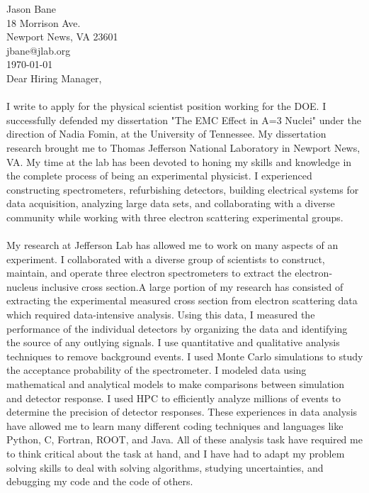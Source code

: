\documentclass[12pt,letterpaper]{article}
\newcommand{\CPP}
{C\nolinebreak[4]\hspace{-.05em}\raisebox{.22ex}{\footnotesize\bf ++}}
\begin{document}
\vspace*{-1.2cm}
\noindent Jason Bane\\
18 Morrison Ave. \\
Newport News, VA 23601 \\
jbane@jlab.org \\
\today\\

Dear Hiring Manager,

\paragraph{}I write to apply for the physical scientist position working for the DOE. I successfully defended my dissertation "The EMC Effect in A=3 Nuclei" under the direction of Nadia Fomin, at the University of Tennessee. My dissertation research brought me to Thomas Jefferson National Laboratory in Newport News, VA. My time at the lab has been devoted to honing my skills and knowledge in the complete process of being an experimental physicist. I experienced constructing spectrometers, refurbishing detectors, building electrical systems for data acquisition, analyzing large data sets, and collaborating with a diverse community while working with three electron scattering experimental groups.
\paragraph{}My research at Jefferson Lab has allowed me to work on many aspects of an experiment. I collaborated with a diverse group of scientists to construct, maintain, and operate three electron spectrometers to extract the electron-nucleus inclusive cross section.A large portion of my research has consisted of extracting the experimental measured cross section from electron scattering data which required data-intensive analysis. Using this data, I measured the performance of the individual detectors by organizing the data and identifying the source of any outlying signals. I use quantitative and qualitative analysis techniques to remove background events. I used Monte Carlo simulations to study the acceptance probability of the spectrometer. I modeled data using mathematical and analytical models to make comparisons between simulation and detector response. I used HPC to efficiently analyze millions of events to determine the precision of detector responses. These experiences in data analysis have allowed me to learn many different coding techniques and languages like Python, \CPP, Fortran, ROOT, and Java. All of these analysis task have required me to think critical about the task at hand, and I have had to adapt my problem solving skills to deal with solving algorithms, studying uncertainties, and debugging my code and the code of others. 
\end{document}
